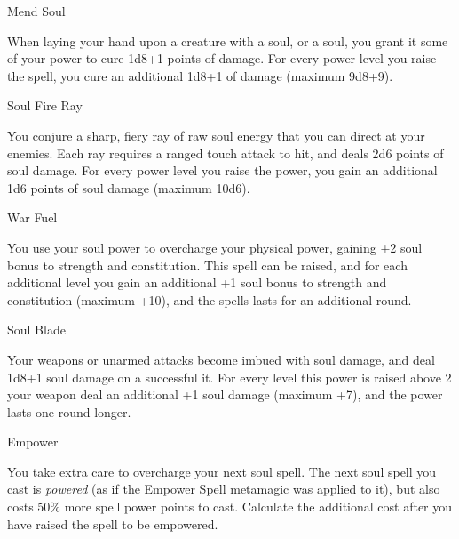 \begin{soulpower}{Mend Soul}
  \rangetouch
  \instantaneous

  When laying your hand upon a creature with a soul, or a soul, you grant it
  some of your power to cure 1d8+1 points of damage. For every power level you
  raise the spell, you cure an additional 1d8+1 of damage (maximum 9d8+9).
\end{soulpower}

\begin{soulpower}{Soul Fire Ray}
  \rangeclose
  \instantaneous

  You conjure a sharp, fiery ray of raw soul energy that you can direct at
  your enemies. Each ray requires a ranged touch attack to hit, and deals 2d6
  points of soul damage. For every power level you raise the power, you gain
  an additional 1d6 points of soul damage (maximum 10d6).
\end{soulpower}

\begin{soulpower}{War Fuel}
  \rangepersonal

  You use your soul power to overcharge your physical power, gaining +2 soul
  bonus to strength and constitution. This spell can be raised, and for each
  additional level you gain an additional +1 soul bonus to strength and
  constitution (maximum +10), and the spells lasts for an additional round.
\end{soulpower}

\begin{soulpower}{Soul Blade}

  Your weapons or unarmed attacks become imbued with soul damage, and deal
  1d8+1 soul damage on a successful it. For every level this power is raised
  above 2 your weapon deal an additional +1 soul damage (maximum +7), and the
  power lasts one round longer.
\end{soulpower}

\begin{soulpower}{Empower}
  \rangepersonal

  You take extra care to overcharge your next soul spell. The next soul spell
  you cast is \emph{powered} (as if the Empower Spell metamagic was applied to
  it), but also costs 50\% more spell power points to cast. Calculate the
  additional cost after you have raised the spell to be empowered.
\end{soulpower}

